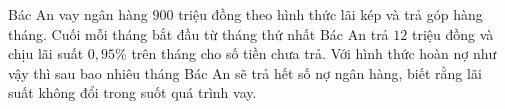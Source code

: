 \begin{ex}%
Bác An vay ngân hàng $900$ triệu đồng theo hình thức lãi kép và trả góp hàng tháng. Cuối mỗi tháng bắt đầu từ tháng thứ nhất Bác An trả $12$ triệu đồng và chịu lãi suất $0{,}95\%$ trên tháng cho số tiền chưa trả. Với hình thức hoàn nợ như vậy thì sau bao nhiêu tháng Bác An sẽ trả hết số nợ ngân hàng, biết rằng lãi suất không đổi trong suốt quá trình vay.
\end{ex}

